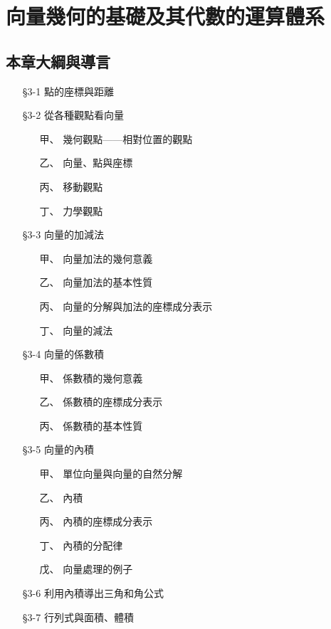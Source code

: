 
\section{向量幾何的基礎及其代數的運算體系}
\label{sec:b3-ch3}

\subsection*{本章大綱與導言}

\begin{itemize}[leftmargin=3em]
  \item[§3-1] 點的座標與距離
  \item[§3-2] 從各種觀點看向量
    \begin{itemize}[leftmargin=2em]
      \item[甲、] 幾何觀點——相對位置的觀點
      \item[乙、] 向量、點與座標
      \item[丙、] 移動觀點
      \item[丁、] 力學觀點
    \end{itemize}
  \item[§3-3] 向量的加減法
    \begin{itemize}[leftmargin=2em]
      \item[甲、] 向量加法的幾何意義
      \item[乙、] 向量加法的基本性質
      \item[丙、] 向量的分解與加法的座標成分表示
      \item[丁、] 向量的減法
    \end{itemize}
  \item[§3-4] 向量的係數積
    \begin{itemize}[leftmargin=2em]
      \item[甲、] 係數積的幾何意義
      \item[乙、] 係數積的座標成分表示
      \item[丙、] 係數積的基本性質
    \end{itemize}
  \item[§3-5] 向量的內積
    \begin{itemize}[leftmargin=2em]
      \item[甲、] 單位向量與向量的自然分解
      \item[乙、] 內積
      \item[丙、] 內積的座標成分表示
      \item[丁、] 內積的分配律
      \item[戊、] 向量處理的例子
    \end{itemize}
  \item[§3-6] 利用內積導出三角和角公式
  \item[§3-7] 行列式與面積、體積
\end{itemize}

